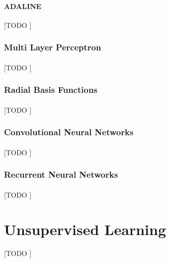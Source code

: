 \documentclass{article}
\begin{document}
				\paragraph{ADALINE}
				\label{sec:adaline}
				[TODO ]

			\subsubsection{Multi Layer Perceptron}
			\label{sec:mlp}

				\paragraph{}
				[TODO ]

			\subsubsection{Radial Basis Functions}
			\label{sec:rbf}

				\paragraph{}
				[TODO ]

			\subsubsection{Convolutional Neural Networks}
			\label{sec:cnn}

				\paragraph{}
				[TODO ]

			\subsubsection{Recurrent Neural Networks}
			\label{sec:rnn}

				\paragraph{}
				[TODO ]

	\section{Unsupervised Learning}
	\label{sec:unsupervised-learning}

			\paragraph{}
			[TODO ]


	\nocite{subject:taa}
	\nocite{pactk:py-machine-learning}

  
  
\end{document}
